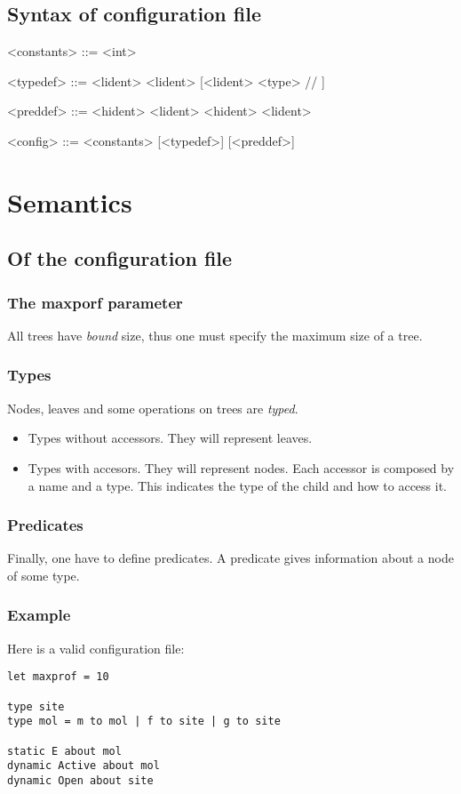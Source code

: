 \documentclass[10pt,a4paper]{article}
\begin{document}
\subsection{Syntax of configuration file}
\begin{grammar}
  <constants> ::=
    \lit{=} <int>

  <typedef> ::=
   <lident>
  \alt {} <lident> \lit{=} [<lident>  <type> // \lit{|} ]

  <preddef> ::=
   <hident>  <lident>
  \alt {} <hident>  <lident>

  <config> ::=
  <constants> [<typedef>] [<preddef>]
\end{grammar}

\section{Semantics}
\subsection{Of the configuration file}
\subsubsection{The maxporf parameter}
All trees have \emph{bound} size, thus one must specify the maximum size of a tree.

\subsubsection{Types}
Nodes, leaves and some operations on trees are \emph{typed}.
\begin{itemize}
\item Types without accessors. They will represent leaves.
\item Types with accesors. They will represent nodes. Each accessor is composed by a name and a type.
  This indicates the type of the child and how to access it.
\end{itemize}

\subsubsection{Predicates}
Finally, one have to define predicates. A predicate gives information about a node of some type.

\subsubsection{Example}
Here is a valid configuration file:
\begin{verbatim}
let maxprof = 10

type site
type mol = m to mol | f to site | g to site

static E about mol
dynamic Active about mol
dynamic Open about site
\end{verbatim}
\end{document}
